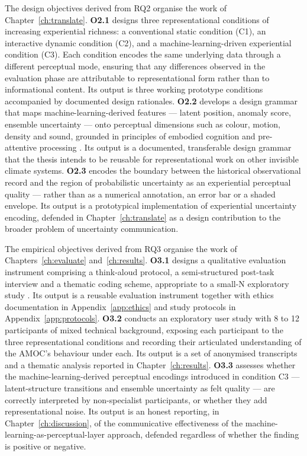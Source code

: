 The design objectives derived from RQ2 organise the work of Chapter~\ref{ch:translate}. \textbf{O2.1} designs three representational conditions of increasing experiential richness: a conventional static condition (C1), an interactive dynamic condition (C2), and a machine-learning-driven experiential condition (C3). Each condition encodes the same underlying data through a different perceptual mode, ensuring that any differences observed in the evaluation phase are attributable to representational form rather than to informational content. Its output is three working prototype conditions accompanied by documented design rationales. \textbf{O2.2} develops a design grammar that maps machine-learning-derived features --- latent position, anomaly score, ensemble uncertainty --- onto perceptual dimensions such as colour, motion, density and sound, grounded in principles of embodied cognition and pre-attentive processing \citep{ware2021, hermann2011}. Its output is a documented, transferable design grammar that the thesis intends to be reusable for representational work on other invisible climate systems. \textbf{O2.3} encodes the boundary between the historical observational record and the region of probabilistic uncertainty as an experiential perceptual quality --- rather than as a numerical annotation, an error bar or a shaded envelope. Its output is a prototypical implementation of experiential uncertainty encoding, defended in Chapter~\ref{ch:translate} as a design contribution to the broader problem of uncertainty communication.

The empirical objectives derived from RQ3 organise the work of Chapters~\ref{ch:evaluate} and~\ref{ch:results}. \textbf{O3.1} designs a qualitative evaluation instrument comprising a think-aloud protocol, a semi-structured post-task interview and a thematic coding scheme, appropriate to a small-N exploratory study \citep{braunclarke2006}. Its output is a reusable evaluation instrument together with ethics documentation in Appendix~\ref{app:ethics} and study protocols in Appendix~\ref{app:protocols}. \textbf{O3.2} conducts an exploratory user study with 8 to 12 participants of mixed technical background, exposing each participant to the three representational conditions and recording their articulated understanding of the AMOC's behaviour under each. Its output is a set of anonymised transcripts and a thematic analysis reported in Chapter~\ref{ch:results}. \textbf{O3.3} assesses whether the machine-learning-derived perceptual encodings introduced in condition C3 --- latent-structure transitions and ensemble uncertainty as felt quality --- are correctly interpreted by non-specialist participants, or whether they add representational noise. Its output is an honest reporting, in Chapter~\ref{ch:discussion}, of the communicative effectiveness of the machine-learning-as-perceptual-layer approach, defended regardless of whether the finding is positive or negative.

